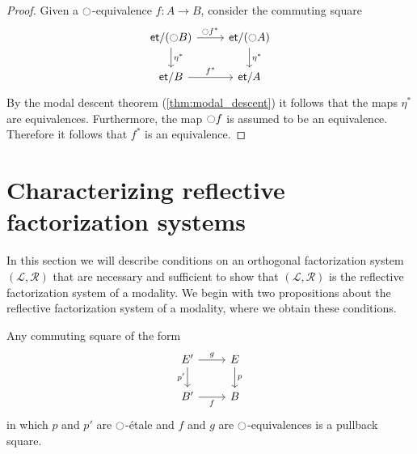 \documentclass[9pt,twosided]{amsart}
\newcommand{\et}{\mathsf{et}}
\begin{document}
\begin{proof}
  Given a ${\ocircle}$-equivalence $f:A\to B$, consider the commuting square
  \begin{equation*}
    \begin{tikzcd}
      \et/(\modal B) \arrow[r,"\modal f^\ast"] \arrow[d,"\eta^\ast"] & \et/(\modal A) \arrow[d,"\eta^\ast"] \\
      \et/B \arrow[r,"f^\ast"] & \et/A
    \end{tikzcd}
  \end{equation*}
  By the modal descent theorem (\cref{thm:modal_descent}) it follows that the maps $\eta^\ast$ are equivalences. Furthermore, the map ${\ocircle} f$ is assumed to be an equivalence. Therefore it follows that $f^\ast$ is an equivalence.
\end{proof}

\section{Characterizing reflective factorization systems}

In this section we will describe conditions on an orthogonal factorization system $(\mathcal{L},\mathcal{R})$ that are necessary and sufficient to show that $(\mathcal{L},\mathcal{R})$ is the reflective factorization system of a modality. We begin with two propositions about the reflective factorization system of a modality, where we obtain these conditions.

\begin{prp}\label{prop:LR-cartesian}
  Any commuting square of the form
  \begin{equation*}
    \begin{tikzcd}
      E' \arrow[d,swap,"{p'}"] \arrow[r,"g"] & E \arrow[d,"p"] \\
      B' \arrow[r,swap,"f"] & B
    \end{tikzcd}
  \end{equation*}
  in which $p$ and $p'$ are ${\ocircle}$-\'etale and $f$ and $g$ are ${\ocircle}$-equivalences is a pullback square.
\end{prp}
\end{document}
